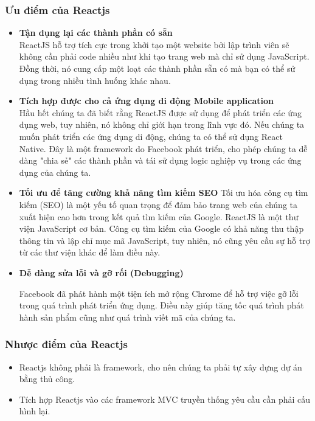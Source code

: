 \subsubsection{Ưu điểm của Reactjs}
\begin{itemize}
    \item \textbf{Tận dụng lại các thành phần có sẵn}\\
    \indent ReactJS hỗ trợ tích cực trong khởi tạo một website bởi lập trình viên sẽ không cần phải code nhiều như khi tạo trang web mà chỉ sử dụng JavaScript. Đồng thời, nó cung cấp một loạt các thành phần sẵn có mà bạn có thể sử dụng trong nhiều tình huống khác nhau.
    \item \textbf{Tích hợp được cho cả ứng dụng di động Mobile application}\\
    \indent Hầu hết chúng ta đã biết rằng ReactJS được sử dụng để phát triển các ứng dụng web, tuy nhiên, nó không chỉ giới hạn trong lĩnh vực đó. Nếu chúng ta muốn phát triển các ứng dụng di động, chúng ta có thể sử dụng React Native. Đây là một framework do Facebook phát triển, cho phép chúng ta dễ dàng "chia sẻ" các thành phần và tái sử dụng logic nghiệp vụ trong các ứng dụng của chúng ta.
    \item \textbf{Tối ưu để tăng cường khả năng tìm kiếm SEO}
    \indent Tối ưu hóa công cụ tìm kiếm (SEO) là một yếu tố quan trọng để đảm bảo trang web của chúng ta xuất hiện cao hơn trong kết quả tìm kiếm của Google. ReactJS là một thư viện JavaScript cơ bản. Công cụ tìm kiếm của Google có khả năng thu thập thông tin và lập chỉ mục mã JavaScript, tuy nhiên, nó cũng yêu cầu sự hỗ trợ từ các thư viện khác để làm điều này.
    \item \textbf{Dễ dàng sửa lỗi và gỡ rối (Debugging)}

    \indent Facebook đã phát hành một tiện ích mở rộng Chrome để hỗ trợ việc gỡ lỗi trong quá trình phát triển ứng dụng. Điều này giúp tăng tốc quá trình phát hành sản phẩm cũng như quá trình viết mã của chúng ta.
\end{itemize}
\subsubsection{Nhược điểm của Reactjs}
\begin{itemize}
    \item Reactjs không phải là framework, cho nên chúng ta phải tự xây dựng dự án bằng thủ công.
    \item Tích hợp Reactjs vào các framework MVC truyền thống yêu cầu cần phải cấu hình lại.
\end{itemize}
